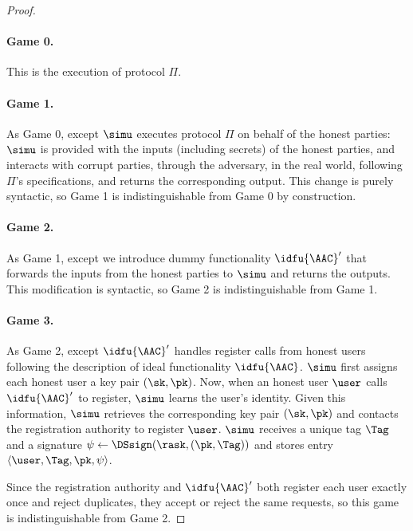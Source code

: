 \begin{proof}

  \paragraph{Game 0.} This is the execution of protocol $\Pi$.

  \paragraph{Game 1.} As Game 0, except $\simu$ executes protocol $\Pi$ on
behalf of the honest parties: $\simu$ is provided with the inputs (including
secrets) of the honest parties, and interacts with corrupt parties, through the
adversary, in the real world, following $\Pi$'s specifications, and returns the
corresponding output. This change is purely syntactic, so Game 1 is
indistinguishable from Game 0 by construction.

  \paragraph{Game 2.} As Game 1, except we introduce dummy functionality
$\idfu{\AAC}'$ that forwards the inputs from the honest parties to $\simu$ and
returns the outputs. This modification is syntactic, so Game 2 is
indistinguishable from Game 1.

  \paragraph{Game 3.} As Game 2, except $\idfu{\AAC}'$ handles register calls
from honest users following the description of ideal functionality
$\idfu{\AAC}$. $\simu$ first assigns each honest user a key pair $(\sk, \pk)$.
Now, when an honest user $\user$ calls $\idfu{\AAC}'$ to register, $\simu$
learns the user's identity. Given this information, $\simu$ retrieves the
corresponding key pair $(\sk,\pk)$ and contacts the registration authority to
register $\user$. $\simu$ receives a unique tag $\Tag$ and a signature $\psi
\leftarrow \DSsign(\rask, (\pk, \Tag))$ and stores entry $\langle \user, \Tag,
\pk, \psi\rangle $.

  Since the registration authority and $\idfu{\AAC}'$ both register each user
exactly once and reject duplicates, they accept or reject the same requests, so
this game is indistinguishable from Game 2.


\end{proof}

